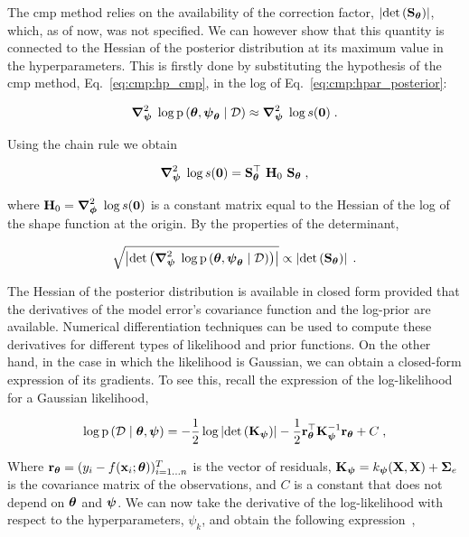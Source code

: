 The \gls{cmp} method relies on the availability of the correction factor, $\left| \mathrm{det}\left(\mathbf{S}_{\boldsymbol{\theta}}\right) \right|$, which, as of now, was not specified. We can however show that this quantity is connected to the Hessian of the posterior distribution at its maximum value in the hyperparameters. This is firstly done by substituting the hypothesis of the \gls{cmp} method, Eq.~\eqref{eq:cmp:hp_cmp}, in the log of Eq.~\eqref{eq:cmp:hpar_posterior}:

\begin{equation}
    \boldsymbol{\nabla}^2_{\boldsymbol{\psi}} \;\log \mathrm{p} \left( \boldsymbol{\theta}, \boldsymbol{\psi}_{\boldsymbol{\theta}} \mid \mathcal{D} \right) \approx \boldsymbol{\nabla}^2_{\boldsymbol{\psi}} \; \log s (\boldsymbol{0}) \;.
\end{equation}

Using the chain rule we obtain

\begin{equation}
    \boldsymbol{\nabla}^2_{\boldsymbol{\psi}} \; \log s (\boldsymbol{0}) = \mathbf{S}_{\boldsymbol{\theta}}^{\top} \ \mathbf{H}_0 \ \mathbf{S}_{\boldsymbol{\theta}} \; ,
\end{equation}

where $\mathbf{H}_0=\boldsymbol{\nabla}^2_{\boldsymbol{\phi}} \ \log s(\boldsymbol{0})$ is a constant matrix equal to the Hessian of the log of the shape function at the origin. By the properties of the determinant, 

\begin{equation}
    \sqrt{\left| \mathrm{det}\left(\boldsymbol{\nabla}^2_{\boldsymbol{\psi}} \;\log \mathrm{p} \left( \boldsymbol{\theta}, \boldsymbol{\psi}_{\boldsymbol{\theta}} \mid \mathcal{D} \right)\right) \right|} \propto \left| \mathrm{det}\left(\mathbf{S}_{\boldsymbol{\theta}}\right) \right| \;.
    \label{eq:cmp:det_jac}
\end{equation}

The Hessian of the posterior distribution is available in closed form provided that the derivatives of the model error's covariance function and the log-prior are available. Numerical differentiation techniques can be used to compute these derivatives for different types of likelihood and prior functions. On the other hand, in the case in which the likelihood is Gaussian, we can obtain a closed-form expression of its gradients. To see this, recall the expression of the log-likelihood for a Gaussian likelihood,

\begin{equation}
    \log \mathrm{p} \left( \mathcal{D} \mid \boldsymbol{\theta}, \boldsymbol{\psi} \right) = -\dfrac{1}{2} \log \left| \mathrm{det}\left(\mathbf{K}_{\boldsymbol{\psi}}\right) \right| - \dfrac{1}{2} \mathbf{r}_{\boldsymbol{\theta}}^{\top} \mathbf{K}_{\boldsymbol{\psi}}^{-1} \mathbf{r}_{\boldsymbol{\theta}} + C \;,
     \label{eq:cmp:ll}
\end{equation}

Where $\mathbf{r}_{\boldsymbol{\theta}} = (y_i - f(\mathbf{x}_i; \boldsymbol{\theta}))^T_{i=1\ldots n}$ is the vector of residuals, $\mathbf{K}_{\boldsymbol{\psi}} = k_{\boldsymbol{\psi}}(\mathbf{X}, \mathbf{X}) + \boldsymbol{\Sigma}_e$ is the covariance matrix of the observations, and $C$ is a constant that does not depend on $\boldsymbol{\theta}$ and $\boldsymbol{\psi}$. We can now take the derivative of the log-likelihood with respect to the hyperparameters, $\psi_k$, and obtain the following expression~\cite{gp_rasmussen},



